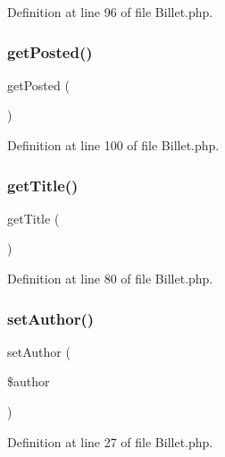 Definition at line 96 of file Billet.\+php.

\mbox{\label{class_src_1_1_entity_1_1_billet_a4a91b6f2e5d3d9220ccbed241e1d2eb0}} 
\subsubsection{get\+Posted()}
{\footnotesize\ttfamily get\+Posted (\begin{DoxyParamCaption}{ }\end{DoxyParamCaption})}



Definition at line 100 of file Billet.\+php.

\mbox{\label{class_src_1_1_entity_1_1_billet_a95e859a4588a39a1824b717378a84c29}} 
\subsubsection{get\+Title()}
{\footnotesize\ttfamily get\+Title (\begin{DoxyParamCaption}{ }\end{DoxyParamCaption})}



Definition at line 80 of file Billet.\+php.

\mbox{\label{class_src_1_1_entity_1_1_billet_afde85a369fc83b442db3cf5c6ac31d4a}} 
\subsubsection{set\+Author()}
{\footnotesize\ttfamily set\+Author (\begin{DoxyParamCaption}\item[{}]{\$author }\end{DoxyParamCaption})}



Definition at line 27 of file Billet.\+php.

\mbox{\label{class_src_1_1_entity_1_1_billet_a04a5eddb7c3abc7bf31fa25b58f046bf}} 
